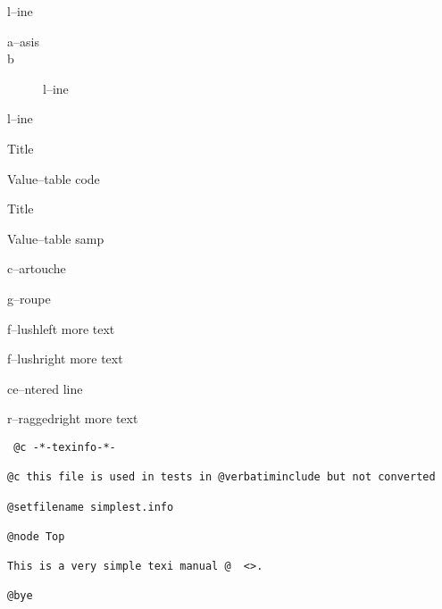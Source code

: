 \documentclass{book}
\newcommand\GNUTexinfotablestylesamp[1]{\ifstrempty{#1}{}{`\texttt{#1}'}}%
\begin{document}
\begin{description}[format=\textbf]
\item[a--strong]
l--ine
\end{description}

\begin{description}
\item[a--asis]
%
\item[b]
%
l--ine
\end{description}

\begin{description}[format=\normalfont\emph]
\item[a]
%
%
\item[b]
%
l--ine
\end{description}

\begin{description}[format=\texttt]
\item[] Title
\item[a{-}{-}code]
Value--table code
\end{description}

\begin{description}[format=\GNUTexinfotablestylesamp]
\item[] Title
\item[a{-}{-}samp]
\item[a2{-}{-}samp]
Value--table samp
\end{description}

\begin{mdframed}[style=GNUTexinfocartouche]
c--artouche
\end{mdframed}

g--roupe

f--lushleft
more text

f--lushright
more text

\begin{center}
ce--ntered line
\end{center}

\begin{flushleft}
r--raggedright
more text
\end{flushleft}

\begin{verbatim}
 @c -*-texinfo-*-

@c this file is used in tests in @verbatiminclude but not converted

@setfilename simplest.info

@node Top

This is a very simple texi manual @  <>.

@bye
\end{verbatim}
\end{document}
